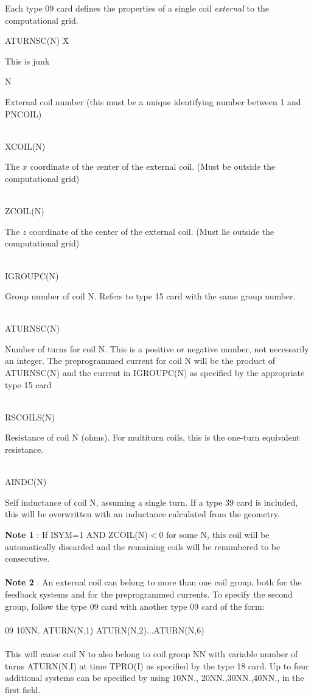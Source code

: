 Each type 09 card defines the properties of a single coil {\em external} to the computational grid.
\begin{tabbing} 
ATURNSC(N) X\= \parbox[t]{\width}{This is junk} \kill 
N \> \parbox[t]{\width}{External coil number (this must be a unique identifying number between
1 and PNCOIL)}\\  
XCOIL(N) \> \parbox[t]{\width}{The $x$ coordinate of the center of the external coil. (Must
be outside the computational grid)}\\ 
ZCOIL(N) \> \parbox[t]{\width}{The $z$ coordinate of the center of the external coil. (Must
lie outside the computational grid)}\\ 
IGROUPC(N) \> \parbox[t]{\width}{Group number of coil N.  Refers to type 15 card with the
same group number.} \\ 
ATURNSC(N) \> \parbox[t]{\width}{Number of turns for coil N.  This is a positive or negative
number, not necessarily an integer.  The preprogrammed current for coil N will be the product
of ATURNSC(N) and the current in IGROUPC(N) as specified by the appropriate type 15 card}\\
RSCOILS(N) \> \parbox[t]{\width}{Resistance of coil N (ohms).  For multiturn coils, this is the
one-turn equivalent resistance.}\\ 
AINDC(N) \> \parbox[t]{\width}{Self inductance of coil N, assuming a single turn.  If a type 39
card is included, this will be overwritten with an inductance calculated from the geometry.} 
\end{tabbing} 
{\bf Note 1} : If ISYM=1 AND ZCOIL(N)$<$0 for some N, this coil will be automatically
discarded
and the remaining coils will be renumbered to be consecutive.\\ 
 \\ 
{\bf Note 2} : An external coil can belong to more than one coil group,
both for the feedback systems and for the preprogrammed currents.  To
specify the second group, follow the type 09 card with another type 09 card of the form:\\ 
 \\ 
09 10NN. ATURN(N,1) ATURN(N,2)...ATURN(N,6)\\ 
 \\ 
This will cause coil N to also belong to coil group NN with variable number of turns
ATURN(N,I) at time TPRO(I) as specified by the type 18 card.  Up to four additional systems
can be specified by using 10NN., 20NN.,30NN.,40NN., in the first field. 
